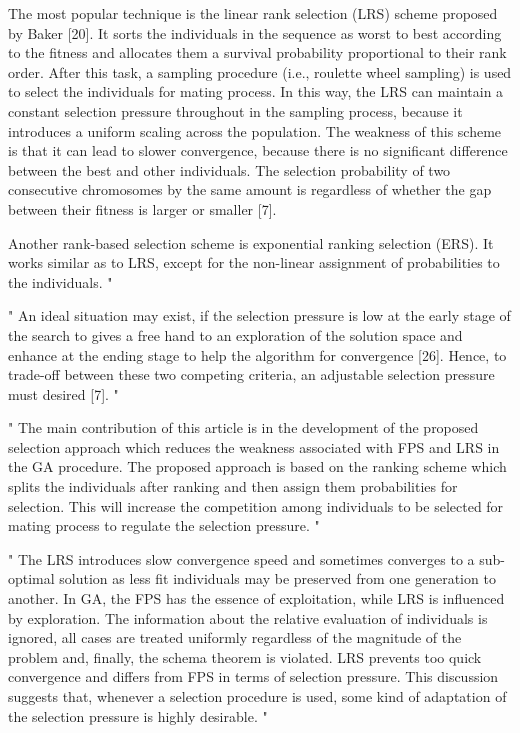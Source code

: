 The most popular technique is the linear rank selection (LRS) scheme proposed by Baker [20]. It sorts the individuals in the sequence as worst to best according to the fitness and allocates them a survival probability proportional to their rank order. After this task, a sampling procedure (i.e., roulette wheel sampling) is used to select the individuals for mating process. In this way, the LRS can maintain a constant selection pressure throughout in the sampling process, because it introduces a uniform scaling across the population.
The weakness of this scheme is that it can lead to slower convergence, because there is no significant difference between the best and other individuals. The selection probability of two consecutive chromosomes by the same amount is regardless of whether the gap between their fitness is larger or smaller [7].


Another rank-based selection scheme is exponential ranking selection (ERS). It works similar as to LRS, except for the non-linear assignment of probabilities to the individuals.
"\cite{hussain_trade-off_2020}


"
An ideal situation may exist, if the selection pressure is low at the early stage of the search to gives a free hand to an exploration of the solution space and enhance at the ending stage to help the algorithm for convergence [26]. Hence, to trade-off between these two competing criteria, an adjustable selection pressure must desired [7].
"\cite{hussain_trade-off_2020}

"
The main contribution of this article is in the development of the proposed selection approach which reduces the weakness associated with FPS and LRS in the GA procedure. The proposed approach is based on the ranking scheme which splits the individuals after ranking and then assign them probabilities for selection. This will increase the competition among individuals to be selected for mating process to regulate the selection pressure.
"\cite{hussain_trade-off_2020}

"
The LRS introduces slow convergence speed and sometimes converges to a sub-optimal solution as less fit individuals may be preserved from one generation to another. In GA, the FPS has the essence of exploitation, while LRS is influenced by exploration. The information about the relative evaluation of individuals is ignored, all cases are treated uniformly regardless of the magnitude of the problem and, finally, the schema theorem is violated. LRS prevents too quick convergence and differs from FPS in terms of selection pressure. This discussion suggests that, whenever a selection procedure is used, some kind of adaptation of the selection pressure is highly desirable.
"\cite{hussain_trade-off_2020}

